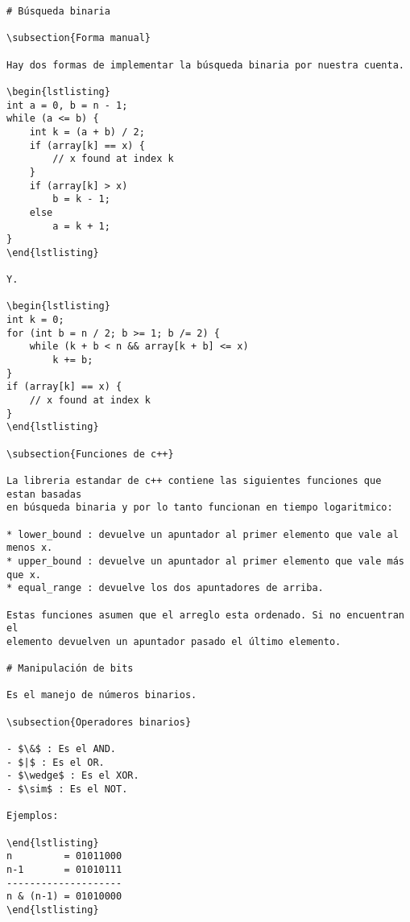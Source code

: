 \documentclass[11pt]{article}
\begin{document}
\begin{verbatim}
# Búsqueda binaria

\subsection{Forma manual}

Hay dos formas de implementar la búsqueda binaria por nuestra cuenta.

\begin{lstlisting}
int a = 0, b = n - 1;
while (a <= b) {
    int k = (a + b) / 2;
    if (array[k] == x) {
        // x found at index k
    }
    if (array[k] > x)
        b = k - 1;
    else
        a = k + 1;
}
\end{lstlisting}

Y.

\begin{lstlisting}
int k = 0;
for (int b = n / 2; b >= 1; b /= 2) {
    while (k + b < n && array[k + b] <= x)
        k += b;
}
if (array[k] == x) {
    // x found at index k
}
\end{lstlisting}

\subsection{Funciones de c++}

La libreria estandar de c++ contiene las siguientes funciones que estan basadas
en búsqueda binaria y por lo tanto funcionan en tiempo logaritmico:

* lower_bound : devuelve un apuntador al primer elemento que vale al menos x.
* upper_bound : devuelve un apuntador al primer elemento que vale más que x. 
* equal_range : devuelve los dos apuntadores de arriba.

Estas funciones asumen que el arreglo esta ordenado. Si no encuentran el
elemento devuelven un apuntador pasado el último elemento.

# Manipulación de bits

Es el manejo de números binarios.

\subsection{Operadores binarios}

- $\&$ : Es el AND.
- $|$ : Es el OR.
- $\wedge$ : Es el XOR.
- $\sim$ : Es el NOT.

Ejemplos:

\end{lstlisting}
n         = 01011000
n-1       = 01010111
--------------------
n & (n-1) = 01010000
\end{lstlisting}


\end{verbatim}
\end{document}
